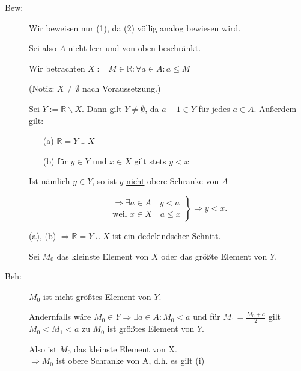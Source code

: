 \documentclass[12pt,a4paper,leqno]{article}
\begin{document}
  \begin{description}
    
    \item[Bew:] 
      
      Wir beweisen nur (1), da (2) völlig analog bewiesen wird.
      
      Sei also $A$ nicht leer und von oben beschränkt.
      
      Wir betrachten $X:= { M \in \mathbb{R} : \forall a \in A : a \leq M }$
      
      (Notiz: $X \neq \emptyset$ nach Voraussetzung.)
      
      Sei $Y := \mathbb{R} \backslash X$. Dann gilt $Y \neq \emptyset$, da $a - 1 \in Y$ für jedes $a \in A$.
      Außerdem gilt: 
      \begin{itemize}
        \item[(a)] $\mathbb{R} = Y \cup X$
        \item[(b)] für $y \in Y$ und $x \in X$ gilt stets $y < x$
      \end{itemize}
      
      Ist nämlich $y \in Y$, so ist $y$ \underline{nicht} obere Schranke von $A$
      
      $$
      \left.
      \begin{array}{l}
        \Rightarrow \exists a \in A \quad y < a \\
        \textrm{weil } x \in X \quad a \leq x
      \end{array}
      \right\} \Rightarrow y < x. $$
      
      (a), (b) $\Rightarrow \mathbb{R} = Y \cup X$ ist ein dedekindscher Schnitt.
      
      Sei $M_0$ das kleinste Element von $X$ oder das größte Element von $Y$.
      
    \item[Beh:] $M_0$ ist nicht größtes Element von $Y$.
      
      Andernfalls wäre $M_0 \in Y \Rightarrow \exists a \in A : M_0 < a$  und für $M_1 = \frac{M_0 + a}{2}$ gilt $M_0 < M_1 < a$ \blitze zu $M_0$ ist größtes Element von $Y$.
      
      
      Also ist $M_0$ das kleinste Element von X.\\
      
      $\Rightarrow M_0$ ist obere Schranke von A, d.h. es gilt (i)\\
      

\end{description}
\end{document}
